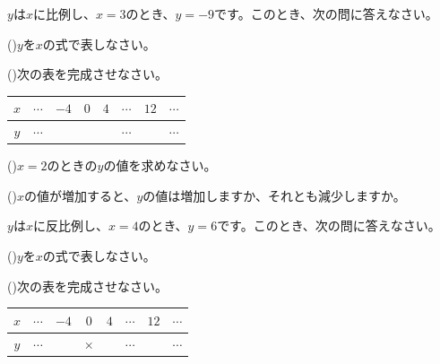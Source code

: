\documentclass[
  12pt,a4paper,lualatex,ja=standard]{bxjsarticle}
\begin{document}
\begin{flushleft}
\vfill

\newpage

\setcounter{skaunta}{0}
\noindent{} \hspace{1pt}$y$は$x$に比例し、$x = 3$のとき、$y = -9$です。このとき、次の問に答えなさい。

()\hspace{2.5pt}$y$を$x$の式で表しなさい。

\vspace{10mm}

()\hspace{2.5pt}次の表を完成させなさい。
\begin{center}
\begin{tabular}{c|ccccccc}
\hline
$x$ & $\cdots$ & $-4$ & $0$ & $4$ & $\cdots$ & $12$ & $\cdots$ \\
\hline
$y$ & $\cdots$ &  &  &  & $\cdots$ & & $\cdots$ \\
\hline
\end{tabular}
\end{center}


()\hspace{2.5pt}$x = 2$のときの$y$の値を求めなさい。

\vspace{10mm}

()\hspace{2.5pt}$x$の値が増加すると、$y$の値は増加しますか、それとも減少しますか。

\setcounter{skaunta}{0}

\vfill

\noindent{} \hspace{1pt}$y$は$x$に反比例し、$x = 4$のとき、$y = 6$です。このとき、次の問に答えなさい。

()\hspace{2.5pt}$y$を$x$の式で表しなさい。

\vspace{10mm}

()\hspace{2.5pt}次の表を完成させなさい。

\begin{center}
\begin{tabular}{c|ccccccc}
\hline
$x$ & $\cdots$ & $-4$ & $0$ & $4$ & $\cdots$ & $12$ & $\cdots$ \\
\hline
$y$ & $\cdots$ &  & $\times$ &  & $\cdots$ & & $\cdots$ \\
\hline
\end{tabular}
\end{center}


\end{flushleft}
\end{document}
